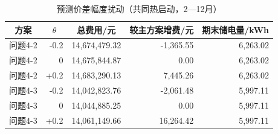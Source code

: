 \par
\begin{table}[!htbp]
\centering
\caption{预测价差幅度扰动（共同热启动，2—12月）}\label{tab:q4-price-sensitivity}
\normalsize
\begin{tabular}{lrrrr}
\toprule
\multicolumn{1}{c}{方案} & \multicolumn{1}{c}{$\theta$} & \multicolumn{1}{c}{总费用/元} & \multicolumn{1}{c}{较主方案增费/元} & \multicolumn{1}{c}{期末储电量/kWh} \\
\midrule
问题4-2 & -0.2 & 14,674,479.32 & -1,365.55 & 6,263.02 \\
问题4-2 & 0 & 14,675,844.87 & 0.00 & 6,263.02 \\
问题4-2 & +0.2 & 14,683,290.13 & 7,445.26 & 6,263.02 \\
问题4-3 & -0.2 & 14,042,823.76 & -2,061.48 & 5,997.11 \\
问题4-3 & 0 & 14,044,885.25 & 0.00 & 5,997.11 \\
问题4-3 & +0.2 & 14,061,149.66 & 16,264.42 & 5,997.11 \\
\bottomrule
\end{tabular}
\end{table}
\par
